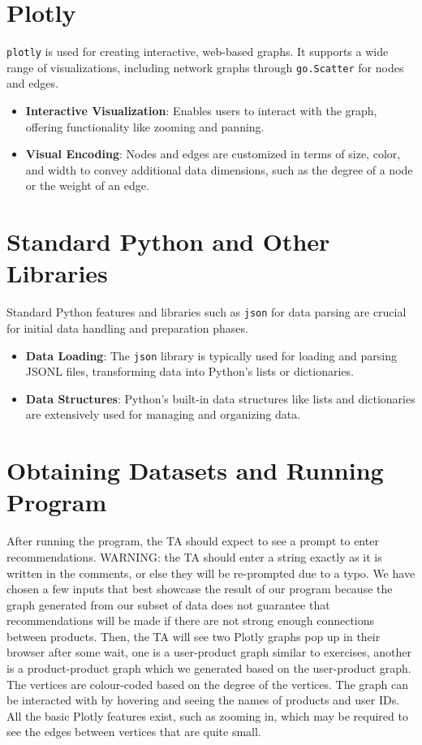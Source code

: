 \documentclass[fontsize=11pt]{article}
\begin{document}
\section*{Plotly}

\texttt{plotly} is used for creating interactive, web-based graphs. It supports a wide range of visualizations, including network graphs through \texttt{go.Scatter} for nodes and edges.

\begin{itemize}
    \item \textbf{Interactive Visualization}: Enables users to interact with the graph, offering functionality like zooming and panning.
    \item \textbf{Visual Encoding}: Nodes and edges are customized in terms of size, color, and width to convey additional data dimensions, such as the degree of a node or the weight of an edge.
\end{itemize}

\section*{Standard Python and Other Libraries}

Standard Python features and libraries such as \texttt{json} for data parsing are crucial for initial data handling and preparation phases.

\begin{itemize}
    \item \textbf{Data Loading}: The \texttt{json} library is typically used for loading and parsing JSONL files, transforming data into Python's lists or dictionaries.
    \item \textbf{Data Structures}: Python's built-in data structures like lists and dictionaries are extensively used for managing and organizing data.
\end{itemize}



\section*{Obtaining Datasets and Running Program}
After running the program, the TA should expect to see a prompt to enter recommendations.
WARNING: the TA should enter a string exactly as it is written in the comments, or else they will be re-prompted due to a typo. We have chosen a few inputs that best showcase the result of our program because the graph generated from our subset of data does not guarantee that recommendations will be made if there are not strong enough connections between products.
Then, the TA will see two Plotly graphs pop up in their browser after some wait, one is a user-product graph similar to exercises, another is a product-product graph which we generated based on the user-product graph. The vertices are colour-coded based on the degree of the vertices. The graph can be interacted with by hovering and seeing the names of products and user IDs. All the basic Plotly features exist, such as zooming in, which may be required to see the edges between vertices that are quite small.
\end{document}
